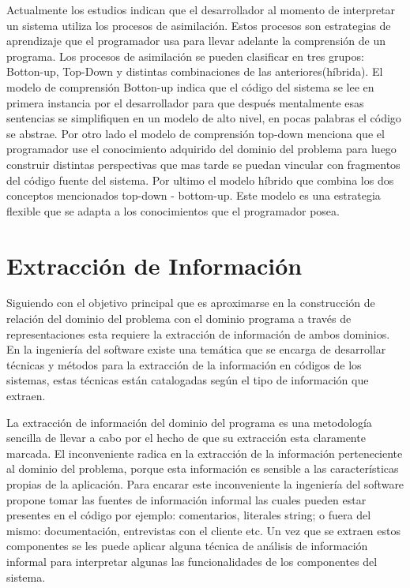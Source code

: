 \documentclass[12pt]{report}
\begin{document}
Actualmente los estudios indican que el desarrollador al momento de interpretar un sistema utiliza los procesos de asimilación. Estos procesos son estrategias de aprendizaje que el programador usa para llevar adelante la comprensión de un programa. Los procesos de asimilación se pueden clasificar en tres grupos: Botton-up, Top-Down y distintas combinaciones de las anteriores(híbrida)\cite{MPOB03}.
El modelo de comprensión Botton-up indica que el código del sistema se lee en primera instancia por el desarrollador para que después mentalmente esas sentencias se simplifiquen en un modelo de alto nivel, en pocas palabras el código se abstrae.
Por otro lado el modelo de comprensión top-down menciona que el programador use el conocimiento adquirido del dominio del problema para luego construir distintas perspectivas que mas tarde se puedan vincular con fragmentos del código fuente del sistema.
Por ultimo el modelo híbrido que combina los dos conceptos mencionados top-down - bottom-up. Este modelo es una estrategia flexible que se adapta a los conocimientos que el programador posea.


\section{Extracción de Información}

Siguiendo con el objetivo principal que es aproximarse en la construcción de relación del dominio del problema con el dominio programa a través de representaciones esta requiere la extracción de información de ambos dominios. En la ingeniería del software existe una temática que se encarga de desarrollar técnicas y métodos para la extracción de la información en códigos de los sistemas, estas técnicas están catalogadas según el tipo de información que extraen.

La extracción de información del dominio del programa es una metodología sencilla de llevar a cabo por el hecho de que su extracción esta claramente marcada. El inconveniente radica en la extracción de la información perteneciente al dominio del problema, porque esta información es sensible a las características propias de la aplicación. Para encarar este inconveniente la ingeniería del software propone tomar las fuentes de información informal las cuales pueden estar presentes en el código por ejemplo: comentarios, literales string; o fuera del mismo: documentación, entrevistas con el cliente etc. Un vez que se extraen estos componentes se les puede aplicar alguna técnica de análisis de información informal para interpretar algunas las funcionalidades de los componentes del sistema.
\end{document}
